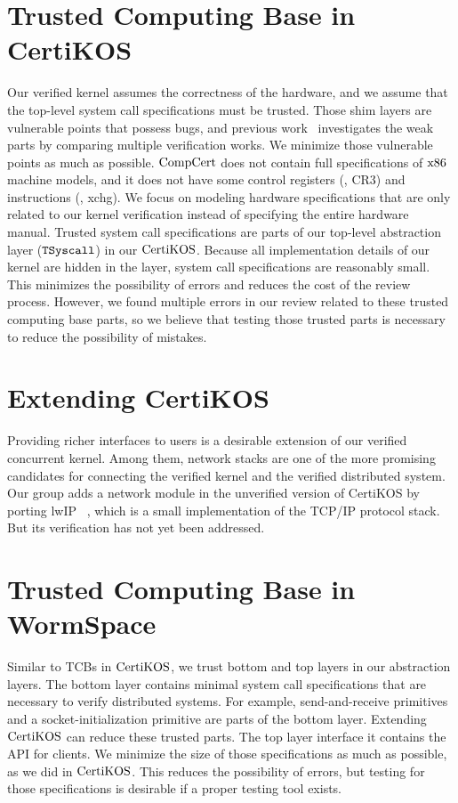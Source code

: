 \section{Trusted Computing Base in CertiKOS}

Our verified kernel assumes the correctness of the hardware, and we assume that the top-level system call specifications must be trusted. 
Those shim layers are vulnerable points that possess bugs, and previous work~\cite{shimlayer} investigates the weak parts by comparing multiple verification works. We minimize those vulnerable points as much as possible. 
$\mathrm{CompCert}$  does not contain full specifications of $\mathrm{x86}$ machine models, 
and it does not have some control registers (\eg, CR3) and instructions (\eg, xchg). 
We focus on modeling hardware specifications that are only related to our kernel verification instead of specifying the entire hardware manual. 
Trusted system call specifications are parts of our top-level abstraction layer (${{\mathrm{\texttt{TSyscall}}}}$) in our $\mathrm{CertiKOS}$. 
Because all implementation details of our kernel are hidden in the layer, system call specifications are reasonably small. 
This minimizes the possibility of errors and reduces the cost of the review process. 
However, we found multiple errors in our review related to these trusted computing base parts, so we believe that testing those trusted parts is necessary to reduce the possibility of mistakes. 

\section{Extending CertiKOS}

Providing richer interfaces to users is a desirable extension of our verified concurrent kernel. Among them, network stacks are 
one of the more promising candidates for connecting the verified kernel and the verified distributed system. 
Our group adds a network module in the unverified 
version of CertiKOS by porting lwIP ~\cite{lwip},  which is a small implementation of the TCP/IP protocol stack. 
But its verification has not yet been addressed.

\section{Trusted Computing Base in WormSpace}

Similar to TCBs in $\mathrm{CertiKOS}$, we trust bottom and top layers in our abstraction layers.
 The bottom layer contains minimal system call specifications that are necessary to verify distributed systems. 
 For example, send-and-receive primitives and a socket-initialization primitive are parts of the bottom layer. 
Extending $\mathrm{CertiKOS}$ can reduce these trusted parts. 
The top layer interface it contains the API for clients. 
We minimize the size of those specifications as much as possible, as we did in $\mathrm{CertiKOS}$. 
This reduces the possibility of errors, but testing for those specifications is desirable if a proper testing tool exists. 


